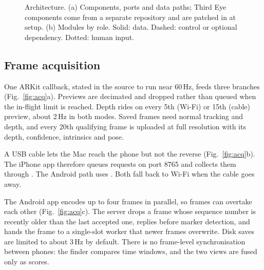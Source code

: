 \documentclass[conference,10pt]{IEEEtran}
\newcommand{\code}[1]{\texttt{\small\detokenize{#1}}}
\newcommand{\codes}[1]{\texttt{\detokenize{#1}}}
\begin{document}
\begin{figure}[!t]
\caption{Architecture. (a) Components, ports and data paths; Third Eye components come from a separate repository and are patched in at setup. (b) Modules by role. Solid: data. Dashed: control or optional dependency. Dotted: human input.}\label{fig:arch}
\end{figure}

\subsection{Frame acquisition}\label{sec:acq}
One ARKit callback, stated in the source to run near 60\,Hz, feeds three branches (Fig.~\ref{fig:acq}a). Previews are decimated and dropped rather than queued when the in-flight limit is reached. Depth rides on every 5th (Wi-Fi) or 15th (cable) preview, about 2\,Hz in both modes. Saved frames need normal tracking and depth, and every 20th qualifying frame is uploaded at full resolution with its depth, confidence, intrinsics and pose.

A USB cable lets the Mac reach the phone but not the reverse (Fig.~\ref{fig:acq}b). The iPhone app therefore queues requests on port 8765 and \code{usb_bridge.py} collects them through \code{iproxy}. The Android path uses \code{adb reverse}. Both fall back to Wi-Fi when the cable goes away.

The Android app encodes up to four frames in parallel, so frames can overtake each other (Fig.~\ref{fig:acq}c). The server drops a frame whose sequence number is recently older than the last accepted one, replies before marker detection, and hands the frame to a single-slot worker that newer frames overwrite. Disk saves are limited to about 3\,Hz by default. There is no frame-level synchronisation between phones: the finder compares time windows, and the two views are fused only as scores.
\end{document}
